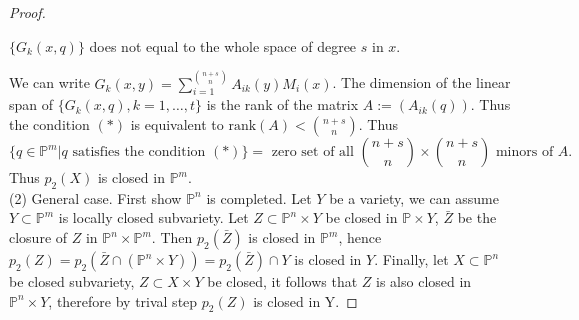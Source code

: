 \documentclass{amsart}
\theoremstyle{plain}
\theoremstyle{definition}
\theoremstyle{remark}
\numberwithin{equation}{section}
\begin{document}
\begin{proof}
\begin{center}
		$ \{ G_k(x,q) \} $ does not equal to the whole space of degree $ s $ in $ x $.
	\end{center}
	We can write $ G_k(x,y)=\sum\limits_{i=1}^{\binom{n+s}{n}} A_{ik}(y)M_i(x) $. The dimension of the linear span of $ \{G_k(x,q),k=1,\dots,t \}$ is the rank of the matrix $ A:=(A_{ik}(q)) $. Thus the condition $ (\ast) $ is equivalent to $ \text{rank}(A)<\binom{n+s}{n} $. Thus
	$$
		\{q\in\mathbb{P}^m|q \text{ satisfies the condition } (\ast) \}=\text{ zero set of all } \binom{n+s}{n}\times \binom{n+s}{n} \text{ minors of } A.
	$$
	Thus $ p_2(X) $ is closed in $ \mathbb{P}^m $.\\
	(2) General case. First show $ \mathbb{P}^n $ is completed. Let $ Y $ be a variety, we can assume $ Y\subset \mathbb{P}^m $ is locally closed subvariety. Let $ Z\subset \mathbb{P}^n\times Y $ be closed in $ \mathbb{P}\times Y $, $ \bar{Z} $ be the closure of $ Z $ in $ \mathbb{P}^n\times\mathbb{P}^m $. Then $ p_2(\bar{Z}) $ is closed in $ \mathbb{P}^m $, hence $ p_2(Z)=p_2(\bar{Z}\cap (\mathbb{P}^n\times Y))=p_2(\bar{Z})\cap Y $ is closed in $ Y $. Finally, let $ X\subset \mathbb{P}^n $ be closed subvariety, $ Z\subset X\times Y $  be closed, it follows that $ Z $ is also closed in $ \mathbb{P}^n\times Y $, therefore by trival step $ p_2(Z) $ is closed in Y.
\end{proof}
\end{document}

